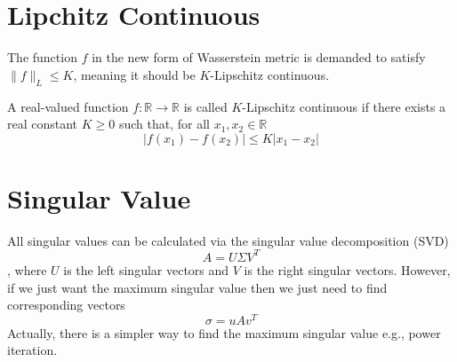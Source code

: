 \begin{appendices}
\section{Lipchitz Continuous}
The function $f$ in the new form of Wasserstein metric is demanded to satisfy $\| f \|_L \leq K$, meaning it should be $K$-Lipschitz continuous. \citep{Lil2017}

A real-valued function $f: \mathbb{R} \rightarrow \mathbb{R}$ is called $K$-Lipschitz continuous if there exists a real constant $K\geq 0$ such that, for all $x_1, x_2 \in \mathbb{R}$
$$\lvert f(x_1) - f(x_2) \rvert \leq K \lvert x_1 - x_2 \rvert$$

\section{Singular Value}
All singular values can be calculated via the singular value decomposition (SVD)
$$A = U\Sigma V^T$$
, where $U$ is the left singular vectors and $V$ is the right singular vectors. However, if we just want the maximum singular value then we just need to find corresponding vectors
$$\sigma = uAv^T$$
Actually, there is a simpler way to find the maximum singular value e.g., power iteration. 



\end{appendices}
